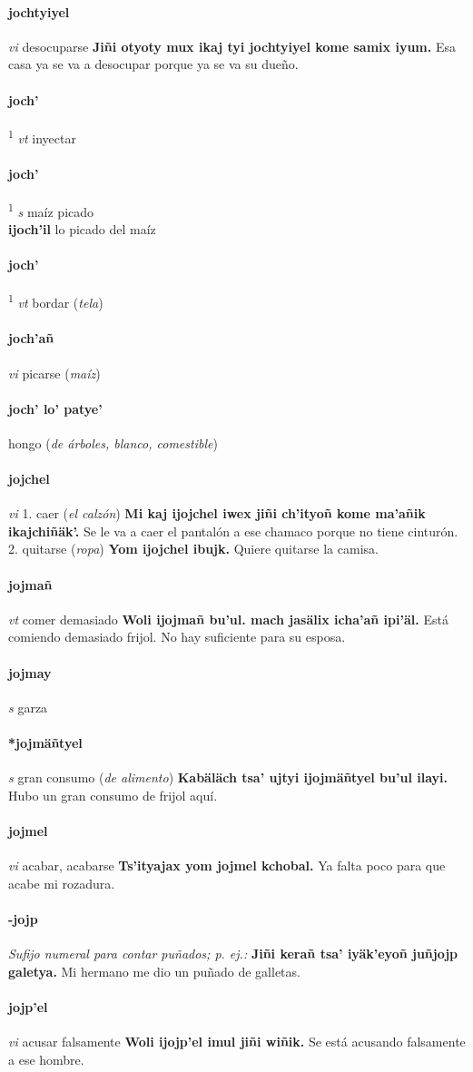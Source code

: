 \documentclass{scrbook}
\newcommand{\entry}[1]{\paragraph{#1}}
\newcommand{\onedefinition}[1]{#1.}
\newcommand{\defsuperscript}[1]{\textsuperscript{1}}
\newcommand{\nontranslationdef}[1]{\textit{#1}}
\newcommand{\partofspeech}[1]{\textit{#1}}
\newcommand{\spanishtranslation}[1]{#1}
\newcommand{\clarification}[1]{(\textit{#1})}
\newcommand{\cholexample}[1]{\textbf{#1}}
\newcommand{\exampletranslation}[1]{#1}
\newcommand{\secondaryentry}[1]{\\\textbf{#1}}
\newcommand{\secondtranslation}[1]{#1}
\begin{document}
\begin{multicols}{2}
\entry{jochtyiyel}
\partofspeech{vi}
\spanishtranslation{desocuparse}
\cholexample{Jiñi otyoty mux ikaj tyi jochtyiyel kome samix iyum.}
\exampletranslation{Esa casa ya se va a desocupar porque ya se va su dueño.}

\entry{joch'}
\defsuperscript{1}
\partofspeech{vt}
\spanishtranslation{inyectar}

\entry{joch'}
\defsuperscript{3}
\partofspeech{s}
\spanishtranslation{maíz picado}
\secondaryentry{ijoch'il}
\secondtranslation{lo picado del maíz}

\entry{joch'}
\defsuperscript{2}
\partofspeech{vt}
\spanishtranslation{bordar}
\clarification{tela}

\entry{joch'añ}
\partofspeech{vi}
\spanishtranslation{picarse}
\clarification{maíz}

\entry{joch' lo' patye'}
\spanishtranslation{hongo}
\clarification{de árboles, blanco, comestible}

\entry{jojchel}
\partofspeech{vi}
\onedefinition{1}
\spanishtranslation{caer}
\clarification{el calzón}
\cholexample{Mi kaj ijojchel iwex jiñi ch'ityoñ kome ma'añik ikajchiñäk'.}
\exampletranslation{Se le va a caer el pantalón a ese chamaco porque no tiene cinturón.}
\onedefinition{2}
\spanishtranslation{quitarse}
\clarification{ropa}
\cholexample{Yom ijojchel ibujk.}
\exampletranslation{Quiere quitarse la camisa.}

\entry{jojmañ}
\partofspeech{vt}
\spanishtranslation{comer demasiado}
\cholexample{Woli ijojmañ bu'ul. mach jasälix icha'añ ipi'äl.}
\exampletranslation{Está comiendo demasiado frijol. No hay suficiente para su esposa.}

\entry{jojmay}
\partofspeech{s}
\spanishtranslation{garza}

\entry{*jojmäñtyel}
\partofspeech{s}
\spanishtranslation{gran consumo}
\clarification{de alimento}
\cholexample{Kabäläch tsa' ujtyi ijojmäñtyel bu'ul ilayi.}
\exampletranslation{Hubo un gran consumo de frijol aquí.}

\entry{jojmel}
\partofspeech{vi}
\spanishtranslation{acabar, acabarse}
\cholexample{Ts'ityajax yom jojmel kchobal.}
\exampletranslation{Ya falta poco para que acabe mi rozadura.}

\entry{-jojp}
\nontranslationdef{Sufijo numeral para contar puñados; p. ej.:}
\cholexample{Jiñi kerañ tsa' iyäk'eyoñ juñjojp galetya.}
\exampletranslation{Mi hermano me dio un puñado de galletas.}

\entry{jojp'el}
\partofspeech{vi}
\spanishtranslation{acusar falsamente}
\cholexample{Woli ijojp'el imul jiñi wiñik.}
\exampletranslation{Se está acusando falsamente a ese hombre.}


\end{multicols}
\end{document}
